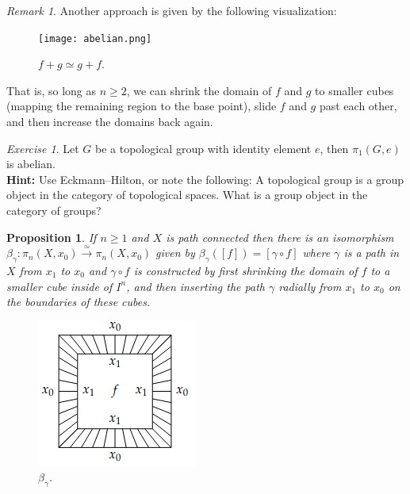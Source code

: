 \documentclass[a4paper]{tufte-book}
\newtheorem{Prop}[equation]{Proposition}
\theoremstyle{remark}
\newtheorem{Ex}[equation]{Exercise}
\newtheorem{Rem}[equation]{Remark}
\begin{document}
\begin{Rem}
	Another approach is given by the following visualization: 
\begin{figure}[h] \centering\texttt{[image: abelian.png]}\caption{$f + g \simeq g +f $.}\label{fig:marginfig}\end{figure}
	That is, so long as $n \ge 2$, we can shrink the domain of $f$ and $g$ to smaller cubes (mapping the remaining region to the base point), slide $f$ and $g$ past each other, and then increase the domains back again. 
\end{Rem}
\begin{Ex}
	Let $G$ be a topological group with identity element $e$, then $\pi_1(G,e)$ is abelian. \\
	\textbf{Hint: } Use Eckmann--Hilton, or note the following: A topological group is a group object in the category of topological spaces. What is a group object in the category of groups? 
\end{Ex}
\begin{Prop}
	If $n \ge 1$ and $X$ is path connected then there is an isomorphism $\beta_{\gamma} : \pi_n(X, x_0) \xrightarrow{\simeq} \pi_n(X, x_0)$ given by $\beta_{\gamma}([ f ]) = [\gamma \circ f ]$ where $\gamma$ is a path in $X$ from $x_1$ to $x_0$ and $\gamma \circ f$ is constructed by first shrinking the domain of $f$ to a smaller cube inside of $I^n$, and then inserting the path $\gamma$ radially from $x_1$ to $x_0$ on the boundaries of these cubes.
	\begin{figure}[h] \centering\includegraphics[scale = 0.5]{path.png}\caption{$\beta_{\gamma}$.}\label{fig:marginfig}\end{figure}
\end{Prop}
\end{document}

